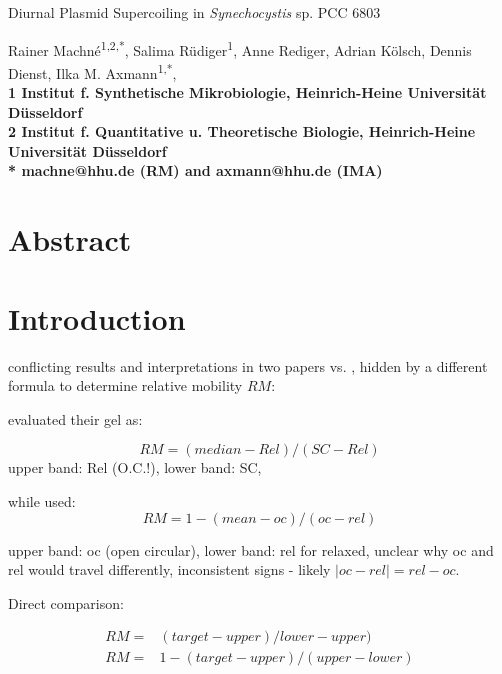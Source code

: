 \documentclass[10pt,letterpaper]{article}
\begin{document}
\vspace*{0.35in}

\begin{flushleft}
{\Large Diurnal Plasmid Supercoiling in \textit{Synechocystis} sp. PCC 6803}

Rainer Machn\'e\textsuperscript{1,2,*},
Salima R\"udiger\textsuperscript{1}, 
Anne Rediger, Adrian K\"olsch, Dennis Dienst,
Ilka M. Axmann\textsuperscript{1,*},
\\
\bigskip
\bf{1} Institut f. Synthetische Mikrobiologie, Heinrich-Heine Universit\"at D\"usseldorf
\\
\bf{2} Institut f. Quantitative u. Theoretische Biologie, Heinrich-Heine Universit\"at D\"usseldorf
\\
\bigskip
* machne@hhu.de (RM) and axmann@hhu.de (IMA)

\end{flushleft}

\section*{Abstract}


\linenumbers


\section{Introduction}

conflicting results and interpretations in two papers
\cite{Woelfle2007} vs. \cite{Vijayan2009},
hidden by a different formula to determine relative mobility $RM$:

\cite{Woelfle2007} evaluated their gel as:

\begin{equation}
  RM = (median - Rel)/(SC - Rel)
\end{equation}
upper band: Rel (O.C.!), lower band: SC,

while \cite{Vijayan2009} used: 
\begin{equation}
  RM = 1 - (mean - oc)/(oc - rel)
\end{equation}

upper band: oc (open circular), lower band: rel for relaxed,
unclear why oc and rel would travel differently,
inconsistent signs - likely $|oc-rel|=rel-oc$.
       
Direct comparison:

\begin{align}
  RM =& (target - upper)/lower - upper)\\
  RM =& 1 - (target - upper)/(upper - lower)
\end{align}
\end{document}
